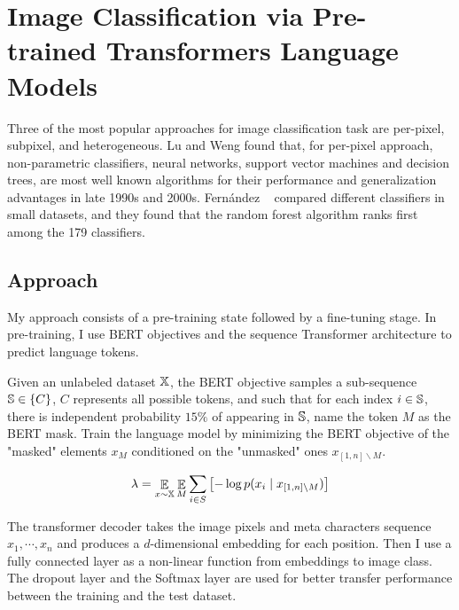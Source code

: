 \documentclass[review]{cvpr}
\begin{document}
\section{Image Classification via Pre-trained Transformers Language Models}

Three of the most popular approaches for image classification task are per-pixel, subpixel, and heterogeneous.
Lu and Weng found that, for per-pixel approach, non-parametric classifiers, \eg neural networks, support vector machines and decision trees,
are most well known algorithms for their performance and generalization advantages in late 1990s and 2000s.
Fern{\'a}ndez \etal~\cite{fernandez2014we} compared different classifiers in small datasets, and they found that the random forest algorithm ranks first among the 179 classifiers.

\subsection{Approach}

My approach consists of a pre-training state followed by a fine-tuning stage.
In pre-training, I use BERT objectives and the sequence Transformer architecture to predict language tokens.

\par Given an unlabeled dataset $\Bbb X$, the BERT objective samples a sub-sequence $\Bbb S \in \{C\}$,
$C$ represents all possible tokens, and such that for each index $i \in \Bbb S$,
there is independent probability $15\%$ of appearing in $\Bbb S$,
name the token $M$ as the BERT mask.
Train the language model by minimizing the BERT objective of the "masked" elements $x_M$
conditioned on the "unmasked" ones $x_{\left[1,n\right]\backslash M}$.

\begin{equation}
  \lambda = \mathop{\Bbb E}\limits_{x\sim\Bbb X} \mathop{\Bbb E}\limits_{M} \sum_{i\in S}{\bigl[-\log{p(x_i\mid x_{\left[1,n \right]\backslash M})\bigr]}}
\end{equation}

\par The transformer decoder takes the image pixels and meta characters sequence $x_1,\cdots,x_n$ and produces a $d$-dimensional
embedding for each position.
Then I use a fully connected layer as a non-linear function from embeddings to image class.
The dropout layer and the Softmax layer are used for better transfer performance between the training and the test dataset.
\end{document}
